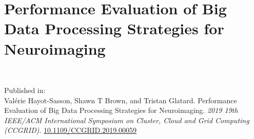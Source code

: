 \chapter{Performance Evaluation of Big Data Processing Strategies for
Neuroimaging}~\label{chp:bigdatastrategies}



\noindent
Published in: \\
Val\'erie Hayot-Sasson, Shawn T Brown, and Tristan Glatard. Performance Evaluation of Big Data Processing Strategies for
Neuroimaging. \textit{2019 19th IEEE/ACM International Symposium on Cluster,
Cloud and Grid Computing (CCGRID)}. \url{10.1109/CCGRID.2019.00059}



